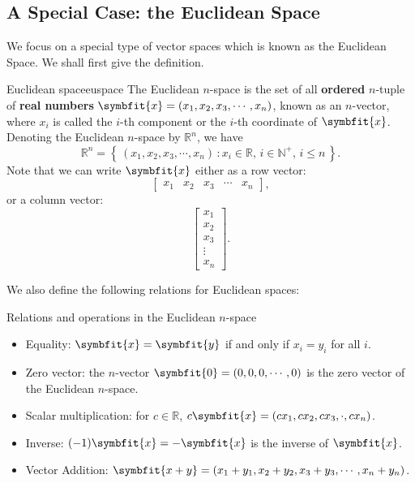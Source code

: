 \documentclass[math]{amznotes}
\theoremstyle{remark}
\begin{document}
\subsection*{A Special Case: the Euclidean Space}
We focus on a special type of vector spaces which is known as the Euclidean Space. We shall first give the definition.
\begin{dfnbox}{Euclidean space}{euspace}
    The Euclidean $n$-space is the set of all {\color{red} \textbf{ordered}} $n$-tuple of {\color{red} \textbf{real numbers}} $\symbfit{x} = \left(x_1, x_2, x_3, \cdots, x_n\right)$, known as an $n$-vector, where $x_i$ is called the $i$-th component or the $i$-th coordinate of $\symbfit{x}$. Denoting the Euclidean $n$-space by $\mathbb{R}^n$, we have
    \begin{displaymath}
        \mathbb{R}^n = \left\{\,\left(x_1, x_2, x_3, \cdots, x_n\right) \,\colon x_i \in \mathbb{R},\, i \in \mathbb{N}^+,\, i \leq n \,\right\}.
    \end{displaymath}
    Note that we can write $\symbfit{x}$ either as a row vector:
    \begin{displaymath}
        \left[\begin{array}{ccccc}
                x_1 & x_2 & x_3 & \cdots & x_n
            \end{array}\right],
    \end{displaymath}
    or a column vector:
    \begin{displaymath}
        \left[\begin{array}{c}
                x_1    \\
                x_2    \\
                x_3    \\
                \vdots \\
                x_n
            \end{array}\right].
    \end{displaymath}
\end{dfnbox}
We also define the following relations for Euclidean spaces:
\begin{genbox}{Relations and operations in the Euclidean $n$-space}
    \begin{itemize}
        \item Equality: $\symbfit{x} = \symbfit{y}$ if and only if $x_i = y_i$ for all $i$.
        \item Zero vector: the $n$-vector $\symbfit{0} = \left(0, 0, 0, \cdots, 0\right)$ is the zero vector of the Euclidean $n$-space.
        \item Scalar multiplication: for $c \in \mathbb{R}$, $c\symbfit{x} = \left(cx_1, cx_2, cx_3, \cdot, cx_n\right)$.
        \item Inverse: $(-1)\symbfit{x} = -\symbfit{x}$ is the inverse of $\symbfit{x}$.
        \item Vector Addition: $\symbfit{x + y} = \left(x_1 + y_1, x_2 + y_2, x_3 + y_3, \cdots, x_n + y_n\right)$.
    \end{itemize}
\end{genbox}
\end{document}
